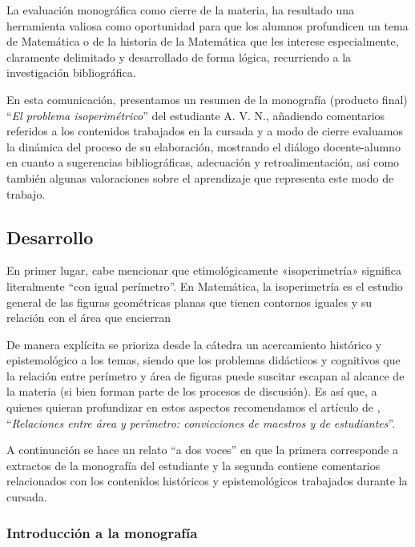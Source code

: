La evaluación monográfica como cierre de la materia, ha resultado una herramienta valiosa como oportunidad para que los alumnos profundicen un tema de Matemática o de la historia de la Matemática que les interese especialmente, claramente delimitado y desarrollado de forma lógica, recurriendo a la investigación bibliográfica.

En esta comunicación, presentamos un resumen de la monografía (producto final) “\textit{El problema isoperimétrico}” del estudiante A. V. N., añadiendo comentarios referidos a los contenidos trabajados en la cursada y a modo de cierre evaluamos la dinámica del proceso de su elaboración, mostrando el diálogo docente-alumno en cuanto a sugerencias bibliográficas, adecuación y retroalimentación, así como también algunas valoraciones sobre el aprendizaje que representa este modo de trabajo.

\subsection{Desarrollo}

En primer lugar, cabe mencionar que etimológicamente «isoperimetría» significa literalmente “con igual perímetro”. En Matemática, la isoperimetría es el estudio general de las figuras geométricas planas que tienen contornos iguales y su relación con el área que encierran

De manera explícita se prioriza desde la cátedra un acercamiento histórico y epistemológico a los temas, siendo que los problemas didácticos y cognitivos que la relación entre perímetro y área de figuras puede suscitar escapan al alcance de la materia (si bien forman parte de los procesos de discusión). Es así que, a quienes quieran profundizar en estos aspectos recomendamos el artículo de \textcite{damore2007}, “\textit{Relaciones entre área y perímetro: convicciones de maestros y de estudiantes}”.

A continuación se hace un relato “a dos voces” en que la primera corresponde a extractos de la monografía del estudiante y la segunda contiene comentarios relacionados con los contenidos históricos y epistemológicos trabajados durante la cursada.

\subsubsection{Introducción a la monografía}

